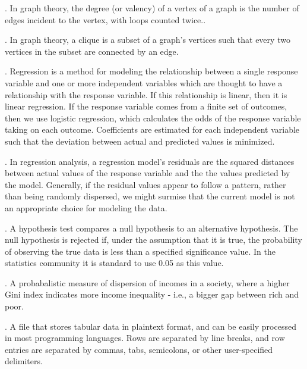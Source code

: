 \documentclass[oneside,12pt]{report}
\begin{document}
\vspace{8pt} . In graph theory, the degree (or valency) of a vertex of a graph is the number of edges incident to the vertex, with loops counted twice..

\vspace{8pt} . In graph theory, a clique is a subset of a graph's vertices such that every two vertices in the subset are connected by an edge.

\vspace{8pt} . Regression is a method for modeling the relationship between a single response variable and one or more independent variables which are thought to have a relationship with the response variable. If this relationship is linear, then it is linear regression. If the response variable comes from a finite set of outcomes, then we use logistic regression, which calculates the odds of the response variable taking on each outcome. Coefficients are estimated for each independent variable such that the deviation between actual and predicted values is minimized.

\vspace{8pt} . In regression analysis, a regression model's residuals are the squared distances between actual values of the response variable and the the values predicted by the model. Generally, if the residual values appear to follow a pattern, rather than being randomly dispersed, we might surmise that the current model is not an appropriate choice for modeling the data.

\vspace{8pt} . A hypothesis test compares a null hypothesis to an alternative hypothesis. The null hypothesis is rejected if, under the assumption that it is true, the probability of observing the true data is less than a specified significance value. In the statistics community it is standard to use 0.05 as this value.

\vspace{8pt} . A probabalistic measure of dispersion of incomes in a society, where a higher Gini index indicates more income inequality - i.e., a bigger gap between rich and poor.

\vspace{8pt} . A file that stores tabular data in plaintext format, and can be easily processed in most programming languages. Rows are separated by line breaks, and row entries are separated by commas, tabs, semicolons, or other user-specified delimiters.
\end{document}
